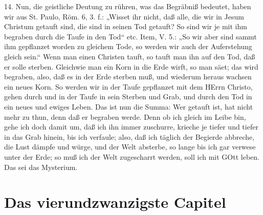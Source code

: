 14. Nun, die geistliche Deutung zu rühren, was das Begräbniß bedeutet, haben wir aus St. Paulo, Röm. 6, 3. f.: „Wisset ihr nicht, daß alle, die wir in Jesum Christum getauft sind, die sind in seinen Tod getauft? So sind wir je mit ihm begraben durch die Taufe in den Tod“ etc. Item, V. 5.: „So wir aber sind sammt ihm gepflanzet worden zu gleichem Tode, so werden wir auch der Auferstehung gleich sein.“ Wenn man einen Christen tauft, so tauft man ihn auf den Tod, daß er solle sterben. Gleichwie man ein Korn in die Erde wirft, so man säet; das wird begraben, also, daß es in der Erde sterben muß, und wiederum heraus wachsen ein neues Korn. So werden wir in der Taufe gepflanzet mit dem HErrn Christo, gehen durch und in der Taufe in sein Sterben und Grab, und durch den Tod in ein neues und ewiges Leben. Das ist nun die Summa: Wer getauft ist, hat nicht mehr zu thun, denn daß er begraben werde. Denn ob ich gleich im Leibe bin, gehe ich doch damit um, daß ich ihn immer zuschurre, krieche je tiefer und tiefer in das Grab hinein, bis ich verfaule; also, daß ich täglich der Begierde abbreche, die Lust dämpfe und würge, und der Welt absterbe, so lange bis ich gar verwese unter der Erde; so muß ich der Welt zugescharrt werden, soll ich mit GOtt leben. Das sei das Mysterium.

\section{Das vierundzwanzigste Capitel}

